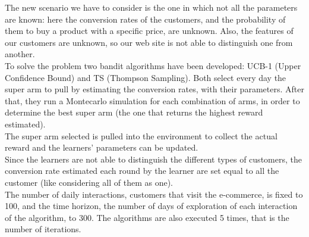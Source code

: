The new scenario we have to consider is the one in which not all the parameters are known: here the conversion rates of the customers, and the probability of them to buy a product with a specific price, are unknown. Also, the features of our customers are unknown, so our web site is not able to distinguish one from another. \\
To solve the problem two bandit algorithms have been developed: UCB-1 (Upper Confidence Bound) and TS (Thompson Sampling).
Both select every day the super arm to pull by estimating the conversion rates, with their parameters. After that, they run a Montecarlo simulation for each combination of arms, in order to determine the best super arm (the one that returns the highest reward estimated).\\
The super arm selected is pulled into the environment to collect the actual reward and the learners' parameters can be updated.\\
Since the learners are not able to distinguish the different types of customers, the conversion rate estimated each round by the learner are set equal to all the customer (like considering all of them as one).\\
The number of daily interactions, customers that visit the e-commerce, is fixed to 100, and the time horizon, the number of days of exploration of each interaction of the algorithm, to 300. The algorithms are also executed 5 times, that is the number of iterations.

